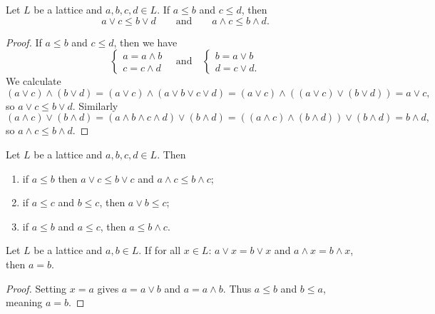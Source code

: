 \begin{lemma} \label{orderLatticeLemma}
Let $L$ be a lattice and $a,b,c,d\in L$. If $a\leq b$ and $c\leq d$, then
\[ a\vee c\leq b\vee d \qquad\text{and}\qquad a\wedge c \leq b\wedge d. \]
\end{lemma}
\begin{proof}
If $a\leq b$ and $c\leq d$, then we have
\[ \begin{cases}
a = a\wedge b \\ c = c\wedge d
\end{cases} \quad \text{and} \quad \begin{cases}
b = a\vee b \\ d = c\vee d.
\end{cases}\]
We calculate
\[ (a\vee c)\wedge (b\vee d) = (a\vee c)\wedge (a\vee b\vee c\vee d) = (a\vee c)\wedge ((a\vee c)\vee (b\vee d)) = a\vee c, \]
so $a\vee c\leq b\vee d$.
Similarly
\[ (a\wedge c)\vee (b\wedge d) = (a\wedge b\wedge c\wedge d)\vee (b\wedge d) = ((a\wedge c)\wedge (b\wedge d))\vee (b\wedge d) = b\wedge d, \]
so $a\wedge c \leq b\wedge d$.
\end{proof}
\begin{corollary} \label{orderLatticeCorollary}
Let $L$ be a lattice and $a,b,c,d\in L$. Then
\begin{enumerate}
\item if $a\leq b$ then $a\vee c \leq b \vee c$ and $a\wedge c \leq b\wedge c$;
\item if $a\leq c$ and $b\leq c$, then $a\vee b \leq c$;
\item if $a\leq b$ and $a\leq c$, then $a\leq b\wedge c$.
\end{enumerate}
\end{corollary}

\begin{lemma} \label{cancellationGeneralLattices}
Let $L$ be a lattice and $a,b\in L$. If for all $x\in L$: $a\vee x = b\vee x$ and $a\wedge x = b\wedge x$, then $a = b$.
\end{lemma}
\begin{proof}
Setting $x = a$ gives $a = a\vee b$ and $a = a\wedge b$. Thus $a \leq b$ and $b \leq a$, meaning $a = b$.
\end{proof}


